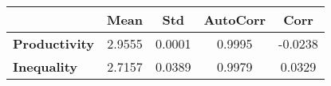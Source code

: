 \begin{tiny}\begin{tabular}{|l|c|c|c|c|}
\hline
&\textbf{Mean}&\textbf{Std}&\textbf{AutoCorr}&\textbf{Corr}\\\hline
\textbf{Productivity}&2.9555&0.0001&0.9995&-0.0238\\\hline
\textbf{Inequality}&2.7157&0.0389&0.9979&0.0329\\\hline
\end{tabular}
\end{tiny}